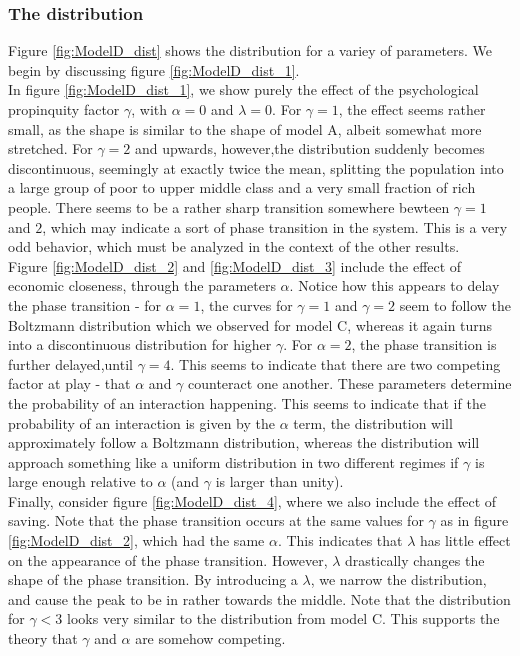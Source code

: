 \documentclass[a4paper, 10pt]{article}
\begin{document}
\subsubsection{The distribution}
Figure \ref{fig:ModelD_dist} shows the distribution for a variey of parameters. We begin by discussing figure \ref{fig:ModelD_dist_1}.\\
\linebreak
In figure \ref{fig:ModelD_dist_1}, we show purely the effect of the psychological propinquity factor $\gamma$, with $\alpha=0$ and $\lambda=0$. For $\gamma=1$, the effect seems rather small, as the shape is similar to the shape of model A, albeit somewhat more stretched. For $\gamma = 2$ and upwards, however,the distribution suddenly becomes discontinuous, seemingly at exactly twice the mean, splitting the population into a large group of poor to upper middle class and a very small fraction of rich people. There seems to be a rather sharp transition somewhere bewteen $\gamma=1$ and $2$, which may indicate a sort of phase transition in the system. This is a very odd behavior, which must be analyzed in the context of the other results.\\
\linebreak
Figure \ref{fig:ModelD_dist_2} and \ref{fig:ModelD_dist_3} include the effect of economic closeness, through the parameters $\alpha$. Notice how this appears to delay the phase transition - for $\alpha=1$, the curves for $\gamma=1$ and $\gamma=2$ seem to follow the Boltzmann distribution which we observed for model C, whereas it again turns into a discontinuous distribution for higher $\gamma$. For $\alpha=2$, the phase transition is further delayed,until $\gamma=4$. This seems to indicate that there are two competing factor at play - that $\alpha$ and $\gamma$ counteract one another. These parameters determine the probability of an interaction happening. This seems to indicate that if the probability of an interaction is given by the $\alpha$ term, the distribution will approximately follow a Boltzmann distribution, whereas the distribution will approach something like a uniform distribution in two different regimes if $\gamma$ is large enough relative to $\alpha$ (and $\gamma$ is larger than unity).\\
\linebreak
Finally, consider figure \ref{fig:ModelD_dist_4}, where we also include the effect of saving. Note that the phase transition occurs at the same values for $\gamma$ as in figure \ref{fig:ModelD_dist_2}, which had the same $\alpha$. This indicates that $\lambda$ has little effect on the appearance of the phase transition. However, $\lambda$ drastically changes the shape of the phase transition. By introducing a $\lambda$, we narrow the distribution, and cause the peak to be in rather towards the middle. Note that the distribution for $\gamma < 3$  looks very similar to the distribution from model C. This supports the theory that $\gamma$ and $\alpha$ are somehow competing.\\
\end{document}
